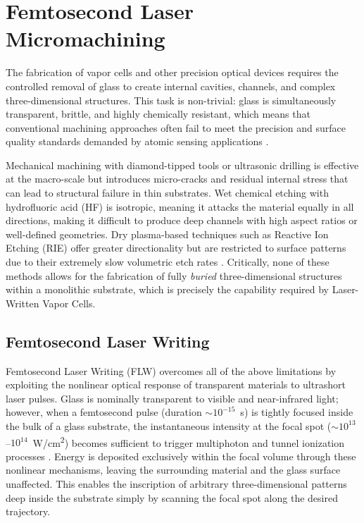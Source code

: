 \FloatBarrier
\section{Femtosecond Laser Micromachining}
\label{sec:flice}
The fabrication of vapor cells and 
other precision optical devices requires the controlled removal of glass to 
create internal cavities, channels, and complex three-dimensional structures. 
This task is non-trivial: glass is simultaneously transparent, brittle, and highly 
chemically resistant, which means that conventional machining approaches 
often fail to meet the precision and surface quality standards demanded by 
atomic sensing applications \cite{gattass2008}.

Mechanical machining with diamond-tipped tools or ultrasonic drilling is 
effective at the macro-scale but introduces micro-cracks and residual internal 
stress that can lead to structural failure in thin substrates. 
Wet chemical etching with hydrofluoric acid (HF) is isotropic, meaning it 
attacks the material equally in all directions, making it difficult to produce 
deep channels with high aspect ratios or well-defined geometries. Dry plasma-based 
techniques such as Reactive Ion Etching (\gls{RIE}) offer greater directionality but 
are restricted to surface patterns due to their extremely slow volumetric etch 
rates \cite{osellame2012}. Critically, none of these methods allows for the 
fabrication of fully \textit{buried} three-dimensional structures within a 
monolithic substrate, which is precisely the capability required by Laser-Written 
Vapor Cells.

\subsection{Femtosecond Laser Writing}
\label{sec:flw}

Femtosecond Laser Writing (\gls{FLW}) overcomes all of the above limitations by 
exploiting the nonlinear optical response of transparent materials to ultrashort 
laser pulses. Glass is nominally transparent to visible and near-infrared light; 
however, when a femtosecond pulse (duration $\sim 10^{-15}$~s) is tightly focused 
inside the bulk of a glass substrate, the instantaneous intensity at the focal 
spot ($\sim 10^{13}$--$10^{14}$~W/cm\textsuperscript{2}) becomes sufficient to 
trigger multiphoton and tunnel ionization processes \cite{gattass2008}. 
Energy is deposited exclusively within the focal volume through these nonlinear 
mechanisms, leaving the surrounding material and the glass surface unaffected. 
This enables the inscription of arbitrary three-dimensional patterns deep inside 
the substrate simply by scanning the focal spot along the desired trajectory.

